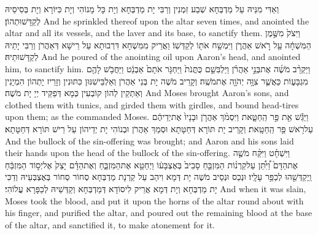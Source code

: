 {וְאַדִּי מִנֵּיהּ עַל מַדְבְּחָא שְׁבַע זִמְנִין וְרַבִּי יָת מַדְבְּחָא וְיָת כָּל מָנוֹהִי וְיָת כִּיּוֹרָא וְיָת בְּסִיסֵיהּ לְקַדָּשׁוּתְהוֹן׃}
{And he sprinkled thereof upon the altar seven times, and anointed the altar and all its vessels, and the laver and its base, to sanctify them.}{}
{וַיִּצֹק֙ מִשֶּׁ֣מֶן הַמִּשְׁחָ֔ה עַ֖ל רֹ֣אשׁ אַהֲרֹ֑ן וַיִּמְשַׁ֥ח אֹת֖וֹ לְקַדְּשֽׁוֹ׃}
{וַאֲרֵיק מִמִּשְׁחָא דִּרְבוּתָא עַל רֵישָׁא דְּאַהֲרֹן וְרַבִּי יָתֵיהּ לְקַדָּשׁוּתֵיהּ׃}
{And he poured of the anointing oil upon Aaron’s head, and anointed him, to sanctify him.}{}
{וַיַּקְרֵ֨ב מֹשֶׁ֜ה אֶת\maqqaf בְּנֵ֣י אַהֲרֹ֗ן וַיַּלְבִּשֵׁ֤ם כֻּתֳּנֹת֙ וַיַּחְגֹּ֤ר אֹתָם֙ אַבְנֵ֔ט וַיַּחֲבֹ֥שׁ לָהֶ֖ם מִגְבָּע֑וֹת כַּאֲשֶׁ֛ר צִוָּ֥ה יְהֹוָ֖ה אֶת\maqqaf מֹשֶֽׁה׃}
{וְקָרֵיב מֹשֶׁה יָת בְּנֵי אַהֲרֹן וְאַלְבֵּישִׁנּוּן כִּתּוּנִין וְזָרֵיז יָתְהוֹן הִמְיָנִין וְאַתְקֵין לְהוֹן קוֹבְעִין כְּמָא דְּפַקֵּיד יְיָ יָת מֹשֶׁה׃}
{And Moses brought Aaron’s sons, and clothed them with tunics, and girded them with girdles, and bound head-tires upon them; as the \lord\space commanded Moses.}{}
{וַיַּגֵּ֕שׁ אֵ֖ת פַּ֣ר הַֽחַטָּ֑את וַיִּסְמֹ֨ךְ אַהֲרֹ֤ן וּבָנָיו֙ אֶת\maqqaf יְדֵיהֶ֔ם עַל\maqqaf רֹ֖אשׁ פַּ֥ר הַֽחַטָּֽאת׃}
{וְקָרֵיב יָת תּוֹרָא דְּחַטָּתָא וּסְמַךְ אַהֲרֹן וּבְנוֹהִי יָת יְדֵיהוֹן עַל רֵישׁ תּוֹרָא דְּחַטָּתָא׃}
{And the bullock of the sin-offering was brought; and Aaron and his sons laid their hands upon the head of the bullock of the sin-offering.}{}
{וַיִּשְׁחָ֗ט וַיִּקַּ֨ח מֹשֶׁ֤ה אֶת\maqqaf הַדָּם֙ וַ֠יִּתֵּ֠ן עַל\maqqaf קַרְנ֨וֹת הַמִּזְבֵּ֤חַ סָבִיב֙ בְּאֶצְבָּע֔וֹ וַיְחַטֵּ֖א אֶת\maqqaf הַמִּזְבֵּ֑חַ וְאֶת\maqqaf הַדָּ֗ם יָצַק֙ אֶל\maqqaf יְס֣וֹד הַמִּזְבֵּ֔חַ וַֽיְקַדְּשֵׁ֖הוּ לְכַפֵּ֥ר עָלָֽיו׃}
{וּנְכַס וּנְסֵיב מֹשֶׁה יָת דְּמָא וִיהַב עַל קַרְנָת מַדְבְּחָא סְחוֹר סְחוֹר בְּאֶצְבְּעֵיהּ וְדַכִּי יָת מַדְבְּחָא וְיָת דְּמָא אֲרֵיק לִיסוֹדָא דְּמַדְבְּחָא וְקַדְּשֵׁיהּ לְכַפָּרָא עֲלוֹהִי׃}
{And when it was slain, Moses took the blood, and put it upon the horns of the altar round about with his finger, and purified the altar, and poured out the remaining blood at the base of the altar, and sanctified it, to make atonement for it.}{}
